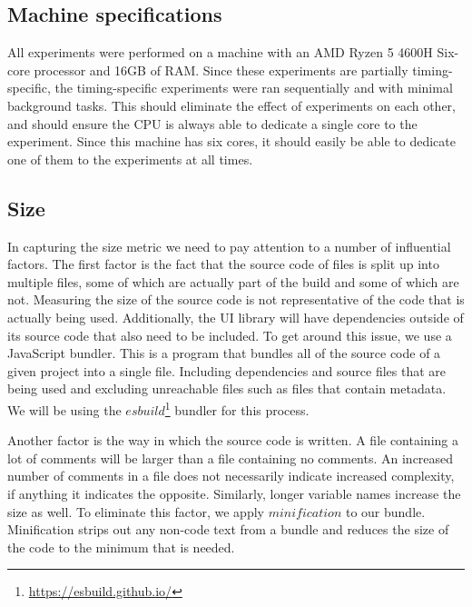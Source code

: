 \subsection{Machine specifications}
All experiments were performed on a machine with an AMD Ryzen 5 4600H Six-core processor and 16GB of RAM. Since these experiments are partially timing-specific, the timing-specific experiments were ran sequentially and with minimal background tasks. This should eliminate the effect of experiments on each other, and should ensure the CPU is always able to dedicate a single core to the experiment. Since this machine has six cores, it should easily be able to dedicate one of them to the experiments at all times.

\subsection{Size}\label{sec:experimental-setup:size}
In capturing the size metric we need to pay attention to a number of influential factors. The first factor is the fact that the source code of files is split up into multiple files, some of which are actually part of the build and some of which are not. Measuring the size of the source code is not representative of the code that is actually being used. Additionally, the UI library will have dependencies outside of its source code that also need to be included. To get around this issue, we use a JavaScript bundler. This is a program that bundles all of the source code of a given project into a single file. Including dependencies and source files that are being used and excluding unreachable files such as files that contain metadata. We will be using the \(esbuild\)\footnote{\url{https://esbuild.github.io/}} bundler for this process.

Another factor is the way in which the source code is written. A file containing a lot of comments will be larger than a file containing no comments. An increased number of comments in a file does not necessarily indicate increased complexity, if anything it indicates the opposite. Similarly, longer variable names increase the size as well. To eliminate this factor, we apply \(minification\) to our bundle. Minification strips out any non-code text from a bundle and reduces the size of the code to the minimum that is needed.

